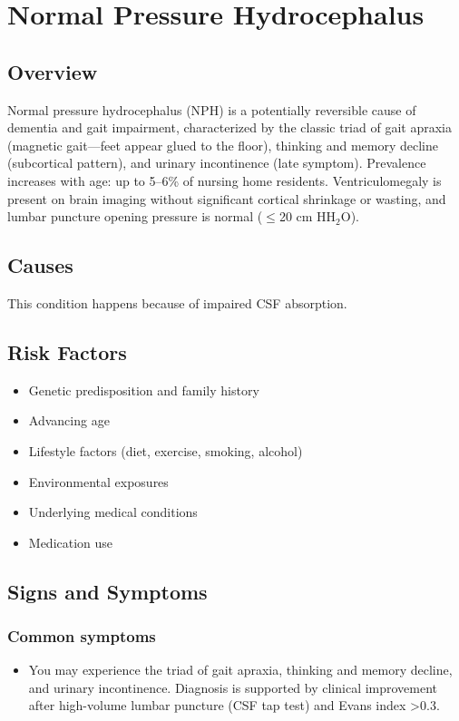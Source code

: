 \chapter{Normal Pressure Hydrocephalus}
\label{sec:Normal Pressure Hydrocephalus}

\section{Overview}
Normal pressure hydrocephalus (NPH) is a potentially reversible cause of dementia and gait impairment, characterized by the classic triad of gait apraxia (magnetic gait---feet appear glued to the floor), thinking and memory decline (subcortical pattern), and urinary incontinence (late symptom). Prevalence increases with age: up to 5--6\% of nursing home residents. Ventriculomegaly is present on brain imaging without significant cortical shrinkage or wasting, and lumbar puncture opening pressure is normal ($\leq$20 cm HH$_2$O).
\section{Causes}
This condition happens because of impaired CSF absorption.     
\section{Risk Factors}

\begin{itemize}[noitemsep]
  \item Genetic predisposition and family history
  \item Advancing age
  \item Lifestyle factors (diet, exercise, smoking, alcohol)
  \item Environmental exposures
  \item Underlying medical conditions
  \item Medication use
\end{itemize}
\section{Signs and Symptoms}

\subsection{Common symptoms}
\begin{itemize}[noitemsep]
  \item You may experience the triad of gait apraxia, thinking and memory decline, and urinary incontinence. Diagnosis is supported by clinical improvement after high-volume lumbar puncture (CSF tap test) and Evans index >0.3. 
  \end{itemize}


